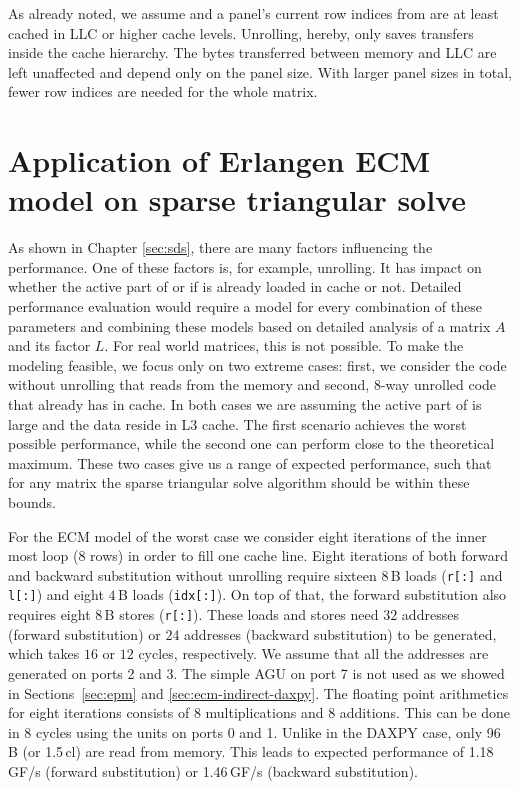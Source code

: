 As already noted, we assume \vr{} and a panel's current row indices from
\vindx{} are at least cached in LLC or higher cache levels.
%
Unrolling, hereby, only saves transfers inside the cache hierarchy.
The bytes transferred between memory and LLC are left unaffected and depend only
on the panel size.
With larger panel sizes in total, fewer
row indices \vindx{} are needed for the
whole matrix.

\section{Application of Erlangen ECM model on sparse triangular solve }
\label{sec:ecm-fwbw}

As shown in Chapter \ref{sec:sds}, there are many factors influencing the performance. One of these factors is, for example, unrolling. It has impact on whether the active part of \vr{} or if \vindx{} is already loaded in cache or not. Detailed performance evaluation would require a model for every combination of these parameters and combining these models based on detailed analysis of a matrix $A$ and its factor $L$. For real world matrices, this is not possible.
To make the modeling feasible, we focus only on two extreme cases: first, we consider the code without unrolling that reads \vindx{} from the memory and second, 8-way unrolled code that already has \vindx{} in cache. In both cases we are assuming the active part of \vr{} is large and the data reside in L3 cache. The first scenario achieves the worst possible performance, while the second one can perform close to the theoretical maximum. These two cases give us a range of expected performance, such that for any matrix the sparse triangular solve algorithm should be within these bounds.

For the ECM model of the worst case we consider eight iterations of the inner most loop (8 rows) in order to fill one cache line.
Eight iterations of both forward and backward substitution without unrolling require sixteen $8$\,B loads (\verb|r[:]| and \verb|l[:]|) and eight $4$\,B loads (\verb'idx[:]').
On top of that, the forward substitution also requires eight $8$\,B stores (\verb'r[:]').
These loads and stores need $32$ addresses (forward substitution) or $24$ addresses (backward substitution) to be generated, which takes $16$ or $12$ cycles, respectively. We assume that all the addresses are generated on ports 2 and 3. The simple AGU on port 7 is not used as we showed in Sections~\ref{sec:epm} and \ref{sec:ecm-indirect-daxpy}.
The floating point arithmetics for eight iterations consists of 8 multiplications and 8 additions. This can be done in 8 cycles using the units on ports 0 and 1.
Unlike in the DAXPY case, only 96\,B (or 1.5\,cl) are read from memory.
This leads to expected performance of 1.18\,GF/s (forward substitution) or 1.46\,GF/s (backward substitution).

